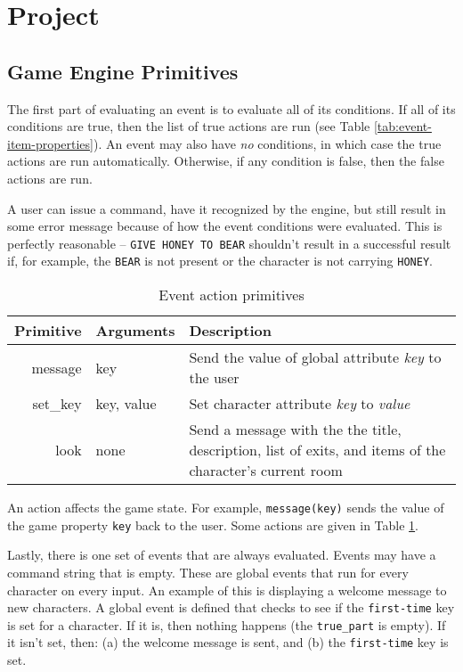 \documentclass{article}
\newcommand{\enterProblemHeader}[1]{
}
\newcommand{\exitProblemHeader}[1]{
\nobreak\extramarks{#1}{}\nobreak
}
\newcounter{homeworkProblemCounter} %
\newcommand{\homeworkProblemName}{}
\newenvironment{homeworkProblem}[1][Problem \arabic{homeworkProblemCounter}]{ %
\stepcounter{homeworkProblemCounter} %
\renewcommand{\homeworkProblemName}{#1} %
\section{\homeworkProblemName} %
\enterProblemHeader{\homeworkProblemName} %
}{
\exitProblemHeader{\homeworkProblemName} %
}
\newcommand{\homeworkSectionName}{}
\newenvironment{homeworkSection}[1]{ %
\renewcommand{\homeworkSectionName}{#1} %
\subsection{\homeworkSectionName} %
\enterProblemHeader{\homeworkProblemName\ [\homeworkSectionName]} %
}{
\enterProblemHeader{\homeworkProblemName} %
}
\begin{document}
\begin{homeworkProblem}[Project]
\begin{homeworkSection}{Game Engine Primitives}
	The first part of evaluating an event is to evaluate all of its conditions. If all of its conditions are true, then the list of true actions are run (see Table \ref{tab:event-item-properties}). An event may also have \textit{no} conditions, in which case the true actions are run automatically. Otherwise, if any condition is false, then the false actions are run.

	A user can issue a command, have it recognized by the engine, but still result in some error message because of how the event conditions were evaluated. This is perfectly reasonable -- \texttt{GIVE HONEY TO BEAR} shouldn't result in a successful result if, for example, the \texttt{BEAR} is not present or the character is not carrying \texttt{HONEY}.

	\begin{table}
		\begin{tabularx}{\textwidth}{|r|l|X|}
			\hline
			Primitive & Arguments & Description \\
			\hline \hline
			message     & key        & Send the value of global attribute \textit{key} to the user \\
			set\_key    & key, value & Set character attribute \textit{key} to \textit{value} \\
			look        & none       & Send a message with the the title, description, list of exits, and items of the character's current room \\
			\hline
		\end{tabularx}
		\caption{Event action primitives}
		\label{tab:event-action-primitives}
	\end{table}

	An action affects the game state. For example, \texttt{message(key)} sends the value of the game property \texttt{key} back to the user. Some actions are given in Table \ref{tab:event-action-primitives}.

	Lastly, there is one set of events that are always evaluated. Events may have a command string that is empty. These are global events that run for every character on every input. An example of this is displaying a welcome message to new characters. A global event is defined that checks to see if the \texttt{first-time} key is set for a character. If it is, then nothing happens (the \texttt{true\_part} is empty). If it isn't set, then: (a) the welcome message is sent, and (b) the \texttt{first-time} key is set.
\end{homeworkSection}



\end{homeworkProblem}
\end{document}
